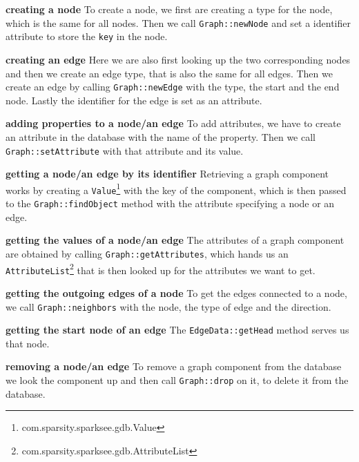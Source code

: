 \textbf{creating a node} \newline
To create a node,
we first are creating a type for the node,
which is the same for all nodes.
Then we call \texttt{Graph::newNode} and set a identifier attribute to store the \texttt{key} in the node.

\textbf{creating an edge} \newline
Here we are also first looking up the two corresponding nodes and then we create an edge type,
that is also the same for all edges.
Then we create an edge by calling \texttt{Graph::newEdge} with the type,
the start and the end node.
Lastly the identifier for the edge is set as an attribute.

\textbf{adding properties to a node/an edge} \newline
To add attributes,
we have to create an attribute in the database with the name of the property.
Then we call \texttt{Graph::setAttribute} with that attribute and its value.

\textbf{getting a node/an edge by its identifier} \newline
Retrieving a graph component works by creating a \texttt{Value}\footnote{com.sparsity.sparksee.gdb.Value} with the key of the component,
which is then passed to the \texttt{Graph::findObject} method with the attribute specifying a node or an edge.

\textbf{getting the values of a node/an edge} \newline
The attributes of a graph component are obtained by calling \texttt{Graph::getAttributes},
which hands us an \texttt{AttributeList}\footnote{com.sparsity.sparksee.gdb.AttributeList} that is then looked up for the attributes we want to get.

\textbf{getting the outgoing edges of a node} \newline
To get the edges connected to a node,
we call \texttt{Graph::neighbors} with the node, the type of edge and the direction.

\textbf{getting the start node of an edge} \newline
The \texttt{EdgeData::getHead} method serves us that node.

\textbf{removing a node/an edge} \newline
To remove a graph component from the database we look the component up and then call \texttt{Graph::drop} on it,
to delete it from the database.
